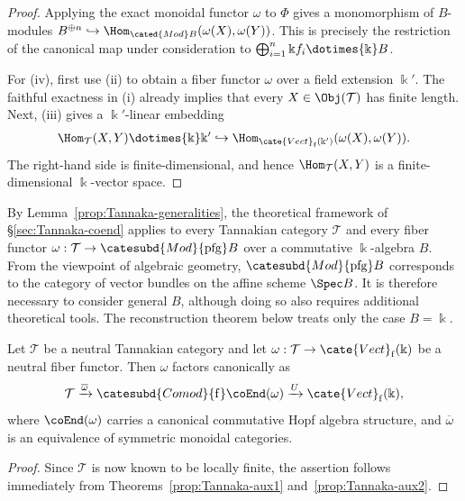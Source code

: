 \begin{proof}
	Applying the exact monoidal functor $\omega$ to $\Phi$ gives a
	monomorphism of $B$-modules
	$B^{\oplus n}\hookrightarrow
	\Hom_{\cated{Mod}B}(\omega(X),\omega(Y))$. This is precisely the
	restriction of the canonical map under consideration to
	$\bigoplus_{i=1}^n\Bbbk f_i\dotimes{\Bbbk}B$.

	For (iv), first use (ii) to obtain a fiber functor $\omega$ over a field
	extension $\Bbbk'$. The faithful exactness in (i) already implies that
	every $X\in\Obj(\mathcal{T})$ has finite length. Next, (iii) gives a
	$\Bbbk'$-linear embedding
	\[ \Hom_{\mathcal{T}}(X,Y)\dotimes{\Bbbk}\Bbbk'
	\hookrightarrow\Hom_{\cate{Vect}_{\mathrm f}(\Bbbk')}
	(\omega(X),\omega(Y)). \]
	The right-hand side is finite-dimensional, and hence
	$\Hom_{\mathcal{T}}(X,Y)$ is a finite-dimensional $\Bbbk$-vector space.
\end{proof}

By Lemma~\ref{prop:Tannaka-generalities}, the theoretical framework of
\S\ref{sec:Tannaka-coend} applies to every Tannakian category $\mathcal{T}$
and every fiber functor
$\omega:\mathcal{T}\to\catesubd{Mod}{\mathrm{pfg}}B$ over a commutative
$\Bbbk$-algebra $B$. From the viewpoint of algebraic geometry,
$\catesubd{Mod}{\mathrm{pfg}}B$ corresponds to the category of vector
bundles on the affine scheme $\Spec B$. It is therefore necessary to
consider general $B$, although doing so also requires additional theoretical
tools. The reconstruction theorem below treats only the case $B=\Bbbk$.

\begin{theorem}\label{prop:Tannaka-neutral}
	Let $\mathcal{T}$ be a neutral Tannakian category and let
	$\omega:\mathcal{T}\to\cate{Vect}_{\mathrm f}(\Bbbk)$ be a neutral
	fiber functor. Then $\omega$ factors canonically as
	\[ \mathcal{T} \xrightarrow{\overline{\omega}} \catesubd{Comod}{\mathrm{f}}\coEnd(\omega) \xrightarrow{U} \cate{Vect}_{\mathrm{f}}(\Bbbk), \]
	where $\coEnd(\omega)$ carries a canonical commutative Hopf algebra
	structure, and $\overline\omega$ is an equivalence of symmetric monoidal
	categories.
\end{theorem}
\begin{proof}
	Since $\mathcal{T}$ is now known to be locally finite, the assertion
	follows immediately from Theorems~\ref{prop:Tannaka-aux1}
	and~\ref{prop:Tannaka-aux2}.
\end{proof}

